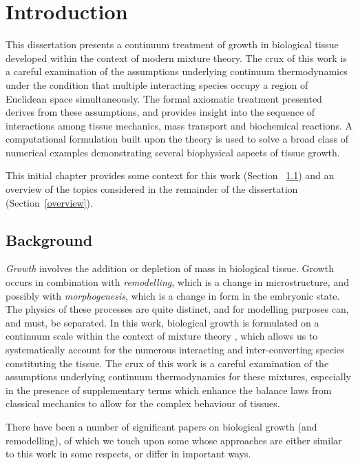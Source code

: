 \chapter{Introduction}
\label{introduction}

This dissertation presents a continuum treatment of growth in
biological tissue developed within the context of modern mixture
theory. The crux of this work is a careful examination of the
assumptions underlying continuum thermodynamics under the condition
that multiple interacting species occupy a region of Euclidean space
simultaneously. The formal axiomatic treatment presented derives from
these assumptions, and provides insight into the sequence of
interactions among tissue mechanics, mass transport and biochemical
reactions. A computational formulation built upon the theory is used
to solve a broad class of numerical examples demonstrating several
biophysical aspects of tissue growth.

This initial chapter provides some context for this work (Section%
~\ref{background}) and an overview of the topics considered in the
remainder of the dissertation (Section~\ref{overview}).

\section{Background}
\label{background}

\emph{Growth} involves the addition or depletion of mass in biological
tissue. Growth occurs in combination with \emph{remodelling}, which is
a change in microstructure, and possibly with \emph{morphogenesis},
which is a change in form in the embryonic state. The physics of these
processes are quite distinct, and for modelling purposes can, and
must, be separated. In this work, biological growth is formulated on a
continuum scale within the context of mixture theory
\citep{TruesdellToupin:60, TruesdellNoll:65, BedfordDrumheller:1983},
which allows us to systematically account for the numerous interacting
and inter-converting species constituting the tissue. The crux of this
work is a careful examination of the assumptions underlying continuum
thermodynamics for these mixtures, especially in the presence of
supplementary terms which enhance the balance laws from classical
mechanics to allow for the complex behaviour of tissues.

There have been a number of significant papers on biological growth
(and remodelling), of which we touch upon some whose approaches are
either similar to this work in some respects, or differ in important
ways.

